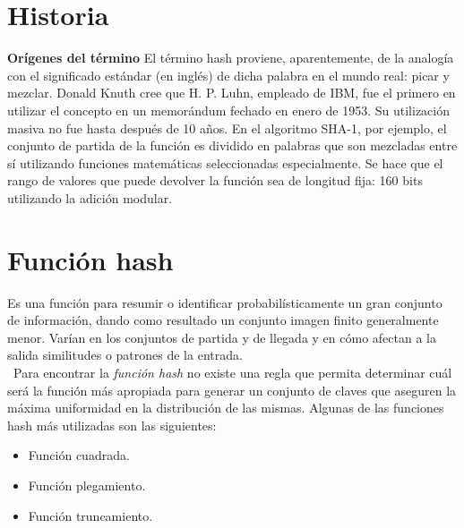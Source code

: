 \documentclass[letterpaper,openright,12pt]{report}
\begin{document}
\section{Historia}

\textbf{Orígenes del término} El término hash proviene, aparentemente,
de la analogía con el significado estándar (en inglés) de dicha palabra
en el mundo real: picar y mezclar. Donald Knuth cree que H. P. Luhn,
empleado de IBM, fue el primero en utilizar el concepto en un memorándum
fechado en enero de 1953. Su utilización masiva no fue hasta después de
10 años. En el algoritmo SHA-1, por ejemplo, el conjunto de partida de
la función es dividido en palabras que son mezcladas entre sí utilizando
funciones matemáticas seleccionadas especialmente. Se hace que el rango
de valores que puede devolver la función sea de longitud fija: 160 bits
utilizando la adición modular.
\newpage
\section{Función hash}

Es una función para resumir o identificar probabilísticamente un gran
conjunto de información, dando como resultado un conjunto imagen finito
generalmente menor. Varían en los conjuntos de partida y de llegada y en
cómo afectan a la salida similitudes o patrones de la entrada.\\\
{Para encontrar la \emph{función hash} no existe una regla que permita
determinar cuál será la función más apropiada para generar un conjunto
de claves que aseguren la máxima uniformidad en la distribución de las
mismas. Algunas de las funciones hash más utilizadas son las
siguientes:}
\begin{itemize}
\itemsep1pt\parskip0pt
\item
  Función cuadrada.
\item
  Función plegamiento.
\item
  Función truncamiento.
\end{itemize}
\end{document}
